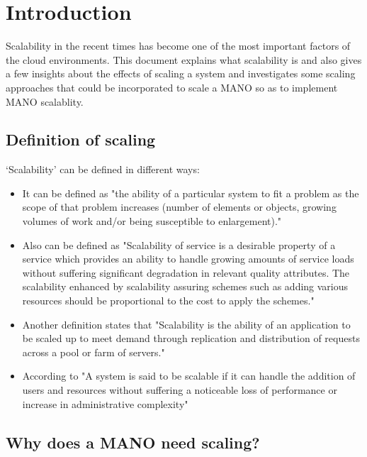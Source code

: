 \chapter{Introduction}
\label{ch:Introduction}

Scalability in the recent times has become one of the most important factors of the cloud environments. This document explains what scalability is and also gives a few insights about the effects of scaling a system and investigates some scaling approaches that could be incorporated to scale a MANO so as to implement MANO scalablity.

\section{Definition of scaling}
`Scalability' can be defined in different ways:
\begin{itemize}
	 

\item It can be defined as \cite{furht_handbook_2010}"the ability of a particular system to fit a problem as the scope of that problem increases (number of elements or objects, growing volumes of work and/or being susceptible to enlargement)."

\item Also can be defined as \cite{lee_software_2010} "Scalability of service is a desirable property of a service which provides an ability to handle growing amounts of service loads without suffering significant degradation in relevant quality attributes. The scalability enhanced by scalability assuring schemes such as adding various resources should be proportional to the cost to apply the schemes." 

\item Another definition states that \cite{chieu_scalability_2011} "Scalability is the ability of an application to be scaled up to meet demand through replication and distribution of requests across a pool or farm of servers."

\item According to \cite{noauthor_scale_nodate}
"A system is said to be scalable if it can handle the addition of users and resources without suffering a noticeable loss of performance or increase in administrative complexity"

\end{itemize}

\section{Why does a MANO need scaling?}
